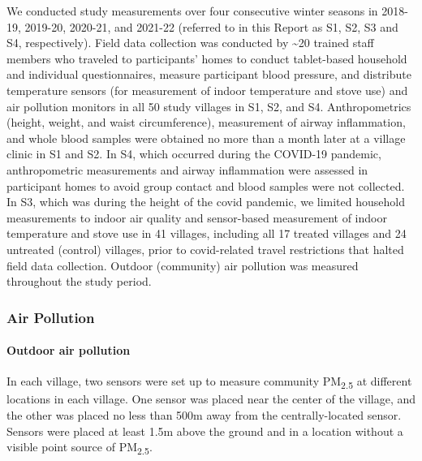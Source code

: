 \documentclass[
  letterpaper,
  DIV=11,
  numbers=noendperiod]{scrartcl}
\let\oldparagraph\paragraph
\renewcommand{\paragraph}[1]{\oldparagraph{#1}\mbox{}}
\begin{document}
We conducted study measurements over four consecutive winter seasons in
2018-19, 2019-20, 2020-21, and 2021-22 (referred to in this Report as
S1, S2, S3 and S4, respectively). Field data collection was conducted by
\textasciitilde20 trained staff members who traveled to participants'
homes to conduct tablet-based household and individual questionnaires,
measure participant blood pressure, and distribute temperature sensors
(for measurement of indoor temperature and stove use) and air pollution
monitors in all 50 study villages in S1, S2, and S4. Anthropometrics
(height, weight, and waist circumference), measurement of airway
inflammation, and whole blood samples were obtained no more than a month
later at a village clinic in S1 and S2. In S4, which occurred during the
COVID-19 pandemic, anthropometric measurements and airway inflammation
were assessed in participant homes to avoid group contact and blood
samples were not collected. In S3, which was during the height of the
covid pandemic, we limited household measurements to indoor air quality
and sensor-based measurement of indoor temperature and stove use in 41
villages, including all 17 treated villages and 24 untreated (control)
villages, prior to covid-related travel restrictions that halted field
data collection. Outdoor (community) air pollution was measured
throughout the study period.

\hypertarget{air-pollution}{%
\subsubsection{Air Pollution}\label{air-pollution}}

\hypertarget{outdoor-air-pollution}{%
\paragraph{Outdoor air pollution}\label{outdoor-air-pollution}}

In each village, two sensors were set up to measure community
PM\textsubscript{2.5} at different locations in each village. One sensor
was placed near the center of the village, and the other was placed no
less than 500m away from the centrally-located sensor. Sensors were
placed at least 1.5m above the ground and in a location without a
visible point source of PM\textsubscript{2.5}.
\end{document}
